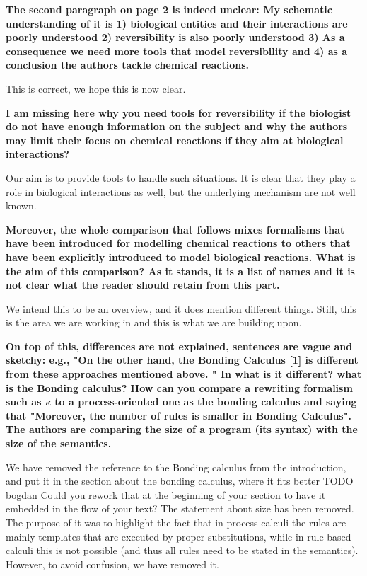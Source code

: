 \documentclass{article}
\begin{document}
\textbf{The second paragraph on page 2 is indeed unclear:
My schematic understanding of it is 1) biological entities and their interactions are poorly understood 2) reversibility is also poorly understood 3) As a consequence we need more tools that model reversibility and 4) as a conclusion the authors tackle chemical reactions.}

This is correct, we hope this is now clear.

\textbf{I am missing here why you need tools for reversibility if the biologist do not have enough information on the subject and why the authors may limit their focus on chemical reactions if they aim at biological interactions?}

Our aim is to provide tools to handle such situations. It is clear that they play a role in biological interactions as well, but the underlying mechanism are not well known.

\textbf{Moreover, the whole comparison that follows mixes formalisms that have been introduced for modelling chemical reactions to others that have been explicitly introduced to model biological reactions. What is the aim of this comparison? As it stands, it is a list of names and it is not clear what the reader should retain from this part.}

We intend this to be an overview, and it does mention different things. Still, this is the area we are working in and this is what we are building upon.

\textbf{On top of this, differences are not explained, sentences are vague and sketchy:
 e.g., "On the other hand, the Bonding Calculus [1] is different from these approaches mentioned above. "
 In what is it different?  what is the Bonding calculus?
How can you compare a rewriting formalism such as $\kappa$ to a process-oriented one as the bonding calculus and saying that "Moreover, the number of rules is smaller in Bonding Calculus". The authors are comparing the size of a program (its syntax) with the size of the semantics.}

We have removed the reference to the Bonding calculus from the introduction, and put it in the section about the bonding calculus, where it fits better TODO bogdan Could you rework that at the beginning of your section to have it embedded in the flow of your text?
The statement about size has been removed. The purpose of it was to highlight the fact that in process
calculi the rules are mainly templates that are executed by proper
substitutions, while in rule-based calculi this is not possible (and thus all
rules need to be stated in the semantics). However, to avoid confusion, we have removed it.
\end{document}
